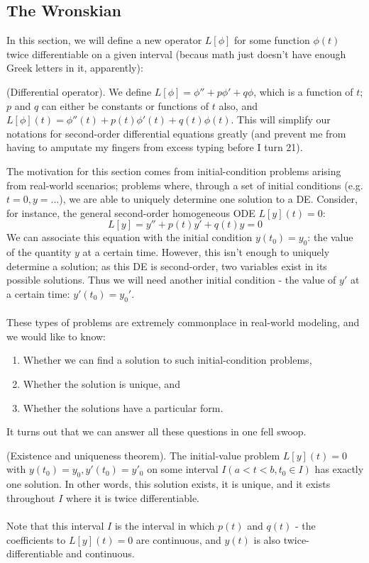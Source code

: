 \documentclass{article}
\begin{document}
\subsection{The Wronskian}
In this section, we will define a new operator $L[\phi]$ for some function $\phi(t)$ twice differentiable on a given interval (becaus math just doesn't have enough Greek letters in it, apparently):
\begin{definition}
    (Differential operator). We define $L[\phi] = \phi'' + p\phi' + q\phi$, which is a function of $t$; $p$ and $q$ can either be constants or functions of $t$ also, and $L[\phi](t) = \phi''(t) + p(t)\phi'(t) + q(t)\phi(t)$. This will simplify our notations for second-order differential equations greatly (and prevent me from having to amputate my fingers from excess typing before I turn 21).
\end{definition}   
The motivation for this section comes from initial-condition problems arising from real-world scenarios; problems where, through a set of initial conditions (e.g. $t=0, y=...$), we are able to uniquely determine one solution to a DE. Consider, for instance, the general second-order homogeneous ODE $L[y](t) = 0$:
\begin{equation*}
    L[y] = y'' + p(t)y' + q(t)y = 0
\end{equation*}
We can associate this equation with the initial condition $y(t_0) = y_0$: the value of the quantity $y$ at a certain time. However, this isn't enough to uniquely determine a solution; as this DE is second-order, two variables exist in its possible solutions. Thus we will need another initial condition - the value of $y'$ at a certain time: $y'(t_0) = y_0'$. \\ \\
These types of problems are extremely commonplace in real-world modeling, and we would like to know:
\begin{enumerate}
    \item Whether we can find a solution to such initial-condition problems,
    \item Whether the solution is unique, and
    \item Whether the solutions have a particular form.
\end{enumerate}
It turns out that we can answer all these questions in one fell swoop.
\begin{theorem}
    (Existence and uniqueness theorem). The initial-value problem $L[y](t) = 0$ with $y(t_0)=y_0, y'(t_0)=y'_0$ on some interval $I (a<t<b, t_0\in I)$ has exactly one solution. In other words, this solution exists, it is unique, and it exists throughout $I$ where it is twice differentiable.
\\ \\
Note that this interval $I$ is the interval in which $p(t)$ and $q(t)$ - the coefficients to $L[y](t)=0$ are continuous, and $y(t)$ is also twice-differentiable and continuous.

\end{theorem}
\end{document}

